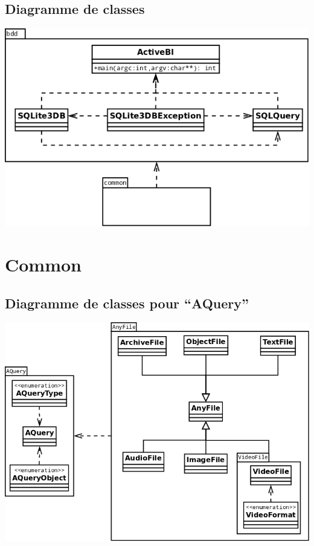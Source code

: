 \documentclass[a4paper,12pt]{report}
\begin{document}
\subsection{Diagramme de classes}\label{diagramme_classes_bdd}
\begin{center}
\includegraphics[scale=0.4]{"images/diagramme_classes_bdd"}
\end{center}

\section{Common}\label{common}

\subsection{Diagramme de classes pour \enquote{AQuery}}
\begin{center}
\includegraphics[scale=0.35]{"images/diagramme_classes_aquery"}
\end{center}
\end{document}
